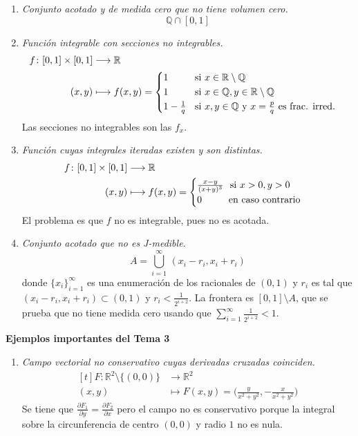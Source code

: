 \documentclass[12pt]{report}
\theoremstyle{definition}
\theoremstyle{definition}
\theoremstyle{remark}
\newcommand{\R}{\mathbb R}
\newcommand{\Q}{\mathbb Q}
\begin{document}
\begin{enumerate}[leftmargin=*]
    \item \textit{Conjunto acotado y de medida cero que no tiene volumen cero.}
    \[\Q \cap [0,1]\]
    \item \textit{Función integrable con secciones no integrables.}
    \[
    \begin{aligned}[t]
    f \colon [0,1] \times [0,1] &\longrightarrow \R \\
    (x,y) &\longmapsto f(x,y) = \begin{cases}
        1 \phantom{-\frac{1}{q}} \ \ \ \ $si$ \ x \in \R \setminus \Q \\
        1 \phantom{-\frac{1}{q}} \ \ \ \ $si$ \ x \in \Q, y \in \R \setminus \Q \\
        1-\frac{1}{q} \ \ \: $si$ \ x, y \in \Q \ $y$ \ x = \frac{p}{q} \ $es frac. irred.$
    \end{cases}
    \end{aligned}
    \]
    Las secciones no integrables son las $f_x$.
    \item \textit{Función cuyas integrales iteradas existen y son distintas.}
    \[
    \begin{aligned}[t]
        f \colon [0,1] \times [0,1] &\longrightarrow \R \\
        (x,y) &\longmapsto f(x,y) = \begin{cases}
            \frac{x-y}{(x+y)^3} \ \ $si$ \ x>0,y>0 \\
            0 \ \ \ \ \ \ \ \: \: $en caso contrario$
        \end{cases}
    \end{aligned}
    \]
    El problema es que $f$ no es integrable, pues no es acotada.
    \item \textit{Conjunto acotado que no es J-medible.}
    \[A = \bigcup_{i=1}^\infty \, (x_i-r_i,x_i+r_i)\]
    donde $\{x_i\}_{i=1}^\infty$ es una enumeración de los racionales de $(0,1)$ y $r_i$ es tal que $(x_i-r_i,x_i+r_i) \subset (0,1)$ y $r_i < \frac{1}{2^{i+2}}$. La frontera es $[0,1] \setminus A$, que se prueba que no tiene medida cero usando que $\sum_{i=1}^\infty \frac{1}{2^{i+2}}<1$.
\end{enumerate}

\pagebreak

\thispagestyle{empty}

\begin{center}
    \textbf{Ejemplos importantes del Tema 3}
\end{center}

\begin{enumerate}[leftmargin=*]
    \item \textit{Campo vectorial no conservativo cuyas derivadas cruzadas coinciden.}
    \[\begin{aligned}[t]
    F \colon \R^2 \setminus \{(0,0)\} &\longrightarrow \R^2 \\
    (x,y) &\longmapsto F(x,y) = \biggl(\frac{y}{x^2+y^2},-\frac{x}{x^2+y^2}\biggr)
    \end{aligned}\]
    Se tiene que $\frac{\partial F_1}{\partial y} = \frac{\partial F_2}{\partial x}$ pero el campo no es conservativo porque la integral sobre la circunferencia de centro $(0,0)$ y radio $1$ no es nula.
\end{enumerate}
\end{document}
